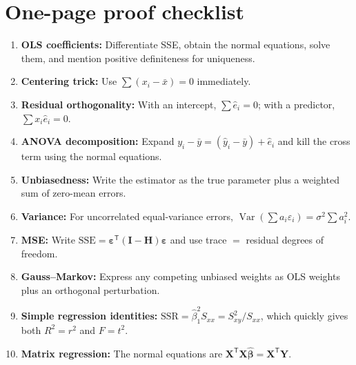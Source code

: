 \documentclass[11pt]{article}
\newcommand{\Sxx}{S_{xx}}
\newcommand{\Sxy}{S_{xy}}
\newcommand{\bone}{\widehat{\beta}_1}
\newcommand{\yhat}{\widehat{y}}
\newcommand{\e}{\widehat{e}}
\newcommand{\Var}{\operatorname{Var}}
\begin{document}
\newpage
\section*{One-page proof checklist}

\begin{enumerate}[leftmargin=*,itemsep=0.55em]
 \item \textbf{OLS coefficients:} Differentiate SSE, obtain the normal
 equations, solve them, and mention positive definiteness for uniqueness.
 \item \textbf{Centering trick:} Use $\sum(x_i-\bar x)=0$ immediately.
 \item \textbf{Residual orthogonality:} With an intercept,
 $\sum\e_i=0$; with a predictor, $\sum x_i\e_i=0$.
 \item \textbf{ANOVA decomposition:} Expand
 $y_i-\bar y=(\yhat_i-\bar y)+\e_i$ and kill the cross term using the normal
 equations.
 \item \textbf{Unbiasedness:} Write the estimator as the true parameter plus
 a weighted sum of zero-mean errors.
 \item \textbf{Variance:} For uncorrelated equal-variance errors,
 $\Var(\sum a_i\varepsilon_i)=\sigma^2\sum a_i^2$.
 \item \textbf{MSE:} Write $\mathrm{SSE}=\boldsymbol\varepsilon^{\mathsf T}
 (\mathbf I-\mathbf H)\boldsymbol\varepsilon$ and use trace $=$ residual
 degrees of freedom.
 \item \textbf{Gauss--Markov:} Express any competing unbiased weights as OLS
 weights plus an orthogonal perturbation.
 \item \textbf{Simple regression identities:}
 $\mathrm{SSR}=\bone^2\Sxx=\Sxy^2/\Sxx$, which quickly gives both
 $R^2=r^2$ and $F=t^2$.
 \item \textbf{Matrix regression:} The normal equations are
 $\mathbf X^{\mathsf T}\mathbf X\widehat{\boldsymbol\beta}
 =\mathbf X^{\mathsf T}\mathbf Y$.
\end{enumerate}
\end{document}
